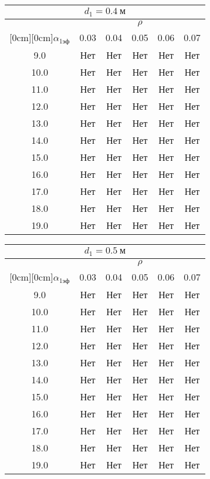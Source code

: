\documentclass[20pt]{article}
\begin{document}
\begin{center}
\begin{tabular}{c|ccccc}
\hline
	\multicolumn{6}{c}{$d_{1}=0.4 \ м$} \\
\hline
	 & \multicolumn{5}{|c}{$\rho$} \\
	\cline{2-6}
	\raisebox{1.5ex}[0cm][0cm]{$\alpha_{1эф}$} & 0.03 & 0.04 & 0.05 & 0.06 & 0.07\\
\hline
	9.0 & 	Нет & 	Нет & 	Нет & 	Нет & 	Нет\\
	10.0 & 	Нет & 	Нет & 	Нет & 	Нет & 	Нет\\
	11.0 & 	Нет & 	Нет & 	Нет & 	Нет & 	Нет\\
	12.0 & 	Нет & 	Нет & 	Нет & 	Нет & 	Нет\\
	13.0 & 	Нет & 	Нет & 	Нет & 	Нет & 	Нет\\
	14.0 & 	Нет & 	Нет & 	Нет & 	Нет & 	Нет\\
	15.0 & 	Нет & 	Нет & 	Нет & 	Нет & 	Нет\\
	16.0 & 	Нет & 	Нет & 	Нет & 	Нет & 	Нет\\
	17.0 & 	Нет & 	Нет & 	Нет & 	Нет & 	Нет\\
	18.0 & 	Нет & 	Нет & 	Нет & 	Нет & 	Нет\\
	19.0 & 	Нет & 	Нет & 	Нет & 	Нет & 	Нет\\
\end{tabular}

\begin{tabular}{c|ccccc}
\hline
	\multicolumn{6}{c}{$d_{1}=0.5 \ м$} \\
\hline
	 & \multicolumn{5}{|c}{$\rho$} \\
	\cline{2-6}
	\raisebox{1.5ex}[0cm][0cm]{$\alpha_{1эф}$} & 0.03 & 0.04 & 0.05 & 0.06 & 0.07\\
\hline
	9.0 & 	Нет & 	Нет & 	Нет & 	Нет & 	Нет\\
	10.0 & 	Нет & 	Нет & 	Нет & 	Нет & 	Нет\\
	11.0 & 	Нет & 	Нет & 	Нет & 	Нет & 	Нет\\
	12.0 & 	Нет & 	Нет & 	Нет & 	Нет & 	Нет\\
	13.0 & 	Нет & 	Нет & 	Нет & 	Нет & 	Нет\\
	14.0 & 	Нет & 	Нет & 	Нет & 	Нет & 	Нет\\
	15.0 & 	Нет & 	Нет & 	Нет & 	Нет & 	Нет\\
	16.0 & 	Нет & 	Нет & 	Нет & 	Нет & 	Нет\\
	17.0 & 	Нет & 	Нет & 	Нет & 	Нет & 	Нет\\
	18.0 & 	Нет & 	Нет & 	Нет & 	Нет & 	Нет\\
	19.0 & 	Нет & 	Нет & 	Нет & 	Нет & 	Нет\\
\end{tabular}


\end{center}
\end{document}
